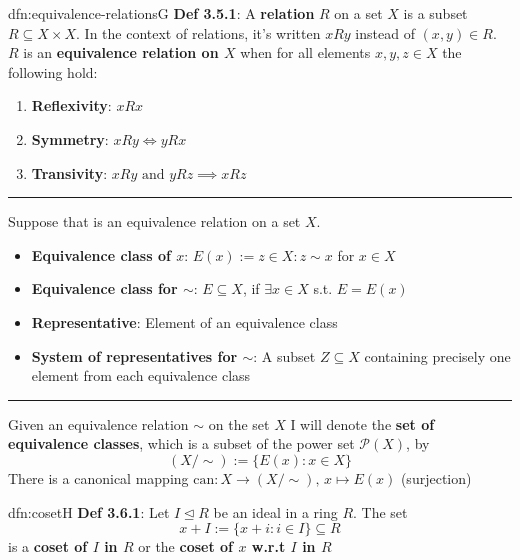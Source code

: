 \documentclass[landscape, 8pt]{extarticle}
\begin{document}
\begin{multicols}{3}
\begin{dfn}{dfn:equivalence-relations}{G}
    \vspace{-5pt}
    \textbf{Def 3.5.1}: A \textbf{relation} $R$ on a set $X$ is a subset $R \subseteq X \times X $. In the context of relations, it's written $xRy$ instead of $(x,y)\in R$. $R$ is an \textbf{equivalence relation on $X$} when for all elements $x, y, z\in X$ the following hold:
    \begin{enumerate}
        \setlength\itemsep{0em}
        \item \textbf{Reflexivity}: $xRx$
        \item \textbf{Symmetry}: $xRy \iff yRx$
        \item \textbf{Transivity}: $xRy \text{ and } yRz \implies xRz$
    \end{enumerate}

    \vspace{-5pt}
    \noindent\rule{\textwidth}{0.2pt}

    Suppose that  is an equivalence relation on a set $X$.

    \vspace{-5pt}
    \begin{itemize}[leftmargin=*]
        \setlength\itemsep{0em}
        \item \textbf{Equivalence class of $x$}: $E(x) := z\in X : z \sim x$ for $x\in X$
        \item \textbf{Equivalence class for $\sim$}: $E\subseteq X$, if $\exists x\in X$ s.t. $E = E(x)$
        \item \textbf{Representative}: Element of an equivalence class
        \item \textbf{System of representatives for $\sim$}: A subset $Z \subseteq X$ containing precisely one element from each equivalence class
    \end{itemize}

    \vspace{-5pt}
    \noindent\rule{\textwidth}{0.2pt}

    Given an equivalence relation $\sim$ on the set $X$ I will denote the \textbf{set of equivalence classes}, which is a subset of the power set $\mathcal{P}(X)$, by
    \[(X / \sim) := \{E(x) : x\in X\}\]
    There is a canonical mapping $\text{can}: X \to (X / \sim),\, x\mapsto E(x)$ (surjection)
\end{dfn}

\vspace{-5pt}
\begin{dfn}[Coset]{dfn:coset}{H}
    \vspace{-5pt}
    \textbf{Def 3.6.1}: Let $I \unlhd R$ be an ideal in a ring $R$. The set
    \[ x + I := \{x + i : i\in I\} \subseteq R\]
    is a \textbf{coset of $I$ in $R$} or the \textbf{coset of $x$ w.r.t $I$ in $R$}


\end{dfn}
\end{multicols}
\end{document}
